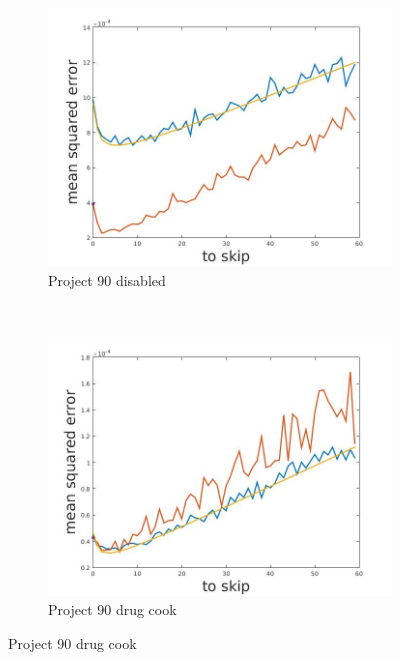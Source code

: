 \documentclass[12pt]{report}
\begin{document}
\begin{figure}[h]
\centering
    \begin{subfigure}[b]{0.3\textwidth}
        \includegraphics[width=\textwidth]{estimators_disabled}
        \caption{ Project 90 disabled}

    \end{subfigure}
    ~
    \begin{subfigure}[b]{0.3\textwidth}
        \includegraphics[width=\textwidth]{estimators_drugCook}
        \caption{ Project 90 drug cook }


\end{subfigure}
\end{figure}
\end{document}
